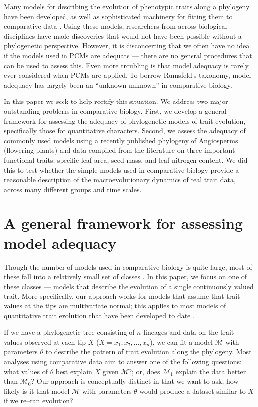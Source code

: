 \documentclass[a4paper,12pt]{article}
\begin{document}
Many models for describing the evolution of phenotypic traits along a phylogeny have been developed, as well as sophisticated machinery for fitting them to comparative data \citep{Omeara2012}. Using these models, researchers from across biological disciplines have made discoveries that would not have been possible without a phylogenetic perspective. However, it is disconcerting that we often have no idea if the models used in PCMs are adequate --- there are no general procedures that can be used to assess this. Even more troubling is that model adequacy is rarely ever considered when PCMs are applied. To borrow Rumsfeld's taxonomy, model adequacy has largely been an ``unknown unknown'' in comparative biology.

In this paper we seek to help rectify this situation. We address two major outstanding problems in comparative biology. First, we develop a general framework for assessing the adequacy of phylogenetic models of trait evolution, specifically those for quantitative characters. Second, we assess the adequacy of commonly used models using a recently published phylogeny of Angiosperms (flowering plants) \citep{Zanne2013} and data compiled from the literature on three important functional traits: specific leaf area, seed mass, and leaf nitrogen content. We did this to test whether the simple models used in comparative biology provide a reasonable description of the macroevolutionary dynamics of real trait data, across many different groups and time scales.

\section{A general framework for assessing model adequacy}
Though the number of models used in comparative biology is quite large, most of these fall into a relatively small set of classes \citep{Omeara2012}. In this paper, we focus on one of these classes --- models that describe the evolution of a single continuously valued trait. More specifically, our approach works for models that assume that trait values at the tips are multivariate normal; this applies to most models of quantitative trait evolution that have been developed to date \citep{Omeara2012}.

If we have a phylogenetic tree consisting of $n$ lineages and data on the trait values observed at each tip $X$ ($X=x_1, x_2, \ldots, x_n$), we can fit a model $\mathcal{M}$ with parameters $\theta$ to describe the pattern of trait evolution along the phylogeny. Most analyses using comparative data aim to answer one of the following questions: what values of $\theta$ best explain $X$ given $\mathcal{M}$?; or, does $\mathcal{M}_1$ explain the data better than $\mathcal{M}_0$? Our approach is conceptually distinct in that we want to ask, how likely is it that model $\mathcal{M}$ with parameters $\theta$ would produce a dataset similar to $X$ if we re--ran evolution?
\end{document}
